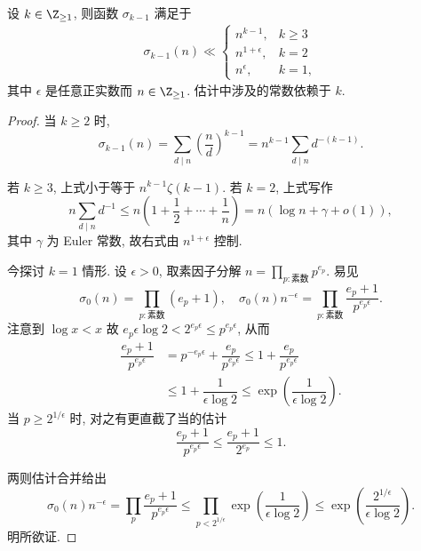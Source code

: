 \begin{lemma}[见 {\cite[Theorem 4.7.3]{Mi89}} ]
	设 $k \in \Z_{\geq 1}$, 则函数 $\sigma_{k-1}$ 满足于
	\begin{gather*}
		\sigma_{k-1}(n) \ll \begin{cases}
			n^{k-1}, & k \geq 3 \\
			n^{1+\epsilon}, & k = 2 \\
			n^\epsilon, & k=1,
	\end{cases}\end{gather*}
	其中 $\epsilon$ 是任意正实数而 $n \in \Z_{\geq 1}$. 估计中涉及的常数依赖于 $k$.
\end{lemma}
\begin{proof}
	当 $k \geq 2$ 时,
	\[ \sigma_{k-1}(n) = \sum_{d \mid n} \left( \frac{n}{d} \right)^{k-1} = n^{k-1} \sum_{d \mid n} d^{-(k-1)}. \]
	
	若 $k \geq 3$, 上式小于等于 $n^{k-1} \zeta(k-1)$. 若 $k=2$, 上式写作
	\[ n \sum_{d \mid n} d^{-1} \leq n \left( 1 + \frac{1}{2} + \cdots + \frac{1}{n} \right) = n \left( \log n + \gamma + o(1) \right), \]
	其中 $\gamma$ 为 Euler 常数, 故右式由 $n^{1 + \epsilon}$ 控制.
	
	今探讨 $k = 1$ 情形. 设 $\epsilon > 0$, 取素因子分解 $n = \prod_{p: \text{素数}} p^{e_p}$. 易见
	\[ \sigma_0(n) = \prod_{p: \text{素数}} (e_p + 1), \quad \sigma_0(n)n^{-\epsilon} = \prod_{p: \text{素数}} \dfrac{e_p + 1}{p^{e_p \epsilon}}. \]
	注意到 $\log x < x$ 故 $e_p \epsilon \log 2 < 2^{e_p\epsilon} \leq p^{e_p \epsilon}$, 从而
	\begin{align*}
		\dfrac{e_p + 1}{p^{e_p \epsilon}} & = p^{-e_p \epsilon} + \dfrac{e_p}{p^{e_p \epsilon}} \leq 1 + \dfrac{e_p}{p^{e_p \epsilon}} \\
		& \leq 1 + \dfrac{1}{\epsilon\log 2} \leq \exp\left( \dfrac{1}{\epsilon \log 2} \right).
	\end{align*}
	当 $p \geq 2^{1/\epsilon}$ 时, 对之有更直截了当的估计
	\[ \dfrac{e_p + 1}{p^{e_p \epsilon}} \leq \dfrac{e_p + 1}{2^{e_p}} \leq 1. \]
	
	两则估计合并给出
	\[ \sigma_0(n) n^{-\epsilon} = \prod_p \dfrac{e_p + 1}{p^{e_p \epsilon}} \leq \prod_{p < 2^{1/\epsilon}} \exp\left( \dfrac{1}{\epsilon \log 2} \right) \leq \exp\left( \dfrac{2^{1/\epsilon}}{\epsilon\log 2} \right). \]
	明所欲证.
\end{proof}

